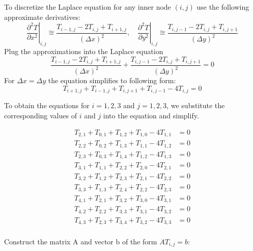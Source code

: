 \documentclass[12pt, a4paper]{article}
\begin{document}
To discretize the Laplace equation for any inner node $(i,j)$ use the following approximate derivatives:
\begin{equation}
\left.\frac{\partial^2 T}{\partial x^2}\right|_{i, j} \cong \frac{T_{i-1, j}-2 T_{i, j}+T_{i+1, j}}{(\Delta x)^2},\left.\quad \frac{\partial^2 T}{\partial y^2}\right|_{i, j} \cong \frac{T_{i, j-1}-2 T_{i, j}+T_{i, j+1}}{(\Delta y)^2}
\end{equation}
Plug the approximations into the Laplace equation
\begin{equation}
 \frac{T_{i-1, j}-2 T_{i, j}+T_{i+1, j}}{(\Delta x)^2} + \frac{T_{i, j-1}-2 T_{i, j}+T_{i, j+1}}{(\Delta y)^2} = 0
\end{equation}
For $\Delta x = \Delta y$ the equation simplifies to following form:
\begin{equation}
T_{i+1, j}+T_{i-1, j}+T_{i, j+1}+T_{i, j-1}-4 T_{i, j}=0
\end{equation}

To obtain the equations for $i=1,2,3$ and $j=1,2,3$, we substitute the corresponding values of $i$ and $j$ into the equation and simplify. 

\begin{equation}
    \begin{align}
        T_{2,1}+T_{0,1}+T_{1,2}+T_{1,0}-4T_{1,1}&=0\\
        T_{2,2}+T_{0,2}+T_{1,3}+T_{1,1}-4T_{1,2}&=0\\
        T_{2,3}+T_{0,3}+T_{1,4}+T_{1,2}-4T_{1,3}&=0\\
        T_{3,1}+T_{1,1}+T_{2,2}+T_{2,0}-4T_{2,1}&=0\\
        T_{3,2}+T_{1,2}+T_{2,3}+T_{2,1}-4T_{2,2}&=0\\
        T_{3,3}+T_{1,3}+T_{2,4}+T_{2,2}-4T_{2,3}&=0\\
        T_{4,1}+T_{2,1}+T_{3,2}+T_{3,0}-4T_{3,1}&=0\\
        T_{4,2}+T_{2,2}+T_{3,3}+T_{3,1}-4T_{3,2}&=0\\
        T_{4,3}+T_{2,3}+T_{3,4}+T_{3,2}-4T_{3,3}&=0\\
    \end{align}
\end{equation}

Construct the matrix A and vector b of the form $AT_{i,j} = b$:
\end{document}
